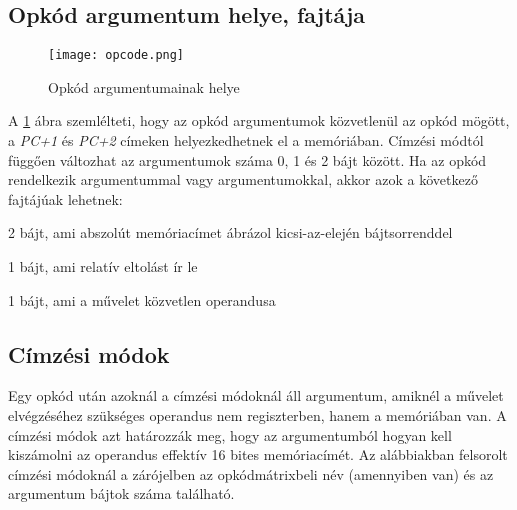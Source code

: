 \subsection{Opkód argumentum helye, fajtája}

\begin{figure}[H]
	\centering
	\texttt{[image: opcode.png]}
	\caption{Opkód argumentumainak helye}
	\label{fig:argplacement}
\end{figure}

A \ref{fig:argplacement} ábra szemlélteti, hogy az opkód argumentumok közvetlenül az opkód mögött, a \emph{PC+1} és \emph{PC+2} címeken helyezkedhetnek el a memóriában. Címzési módtól függően változhat az argumentumok száma 0, 1 és 2 bájt között.
Ha az opkód rendelkezik argumentummal vagy argumentumokkal, akkor azok a következő fajtájúak lehetnek:

\begin{compactitem}
	\item 2 bájt, ami abszolút memóriacímet ábrázol kicsi-az-elején bájtsorrenddel 
	\item 1 bájt, ami relatív eltolást ír le
	\item 1 bájt, ami a művelet közvetlen operandusa
\end{compactitem}

\subsection{Címzési módok}

Egy opkód után azoknál a címzési módoknál áll argumentum, amiknél a művelet elvégzéséhez 
szükséges operandus nem regiszterben, hanem a memóriában van. A címzési módok azt határozzák meg, hogy az argumentumból hogyan kell kiszámolni az operandus effektív 16 bites memóriacímét. Az alábbiakban felsorolt  címzési módoknál a zárójelben az opkódmátrixbeli név (amennyiben van) és az argumentum bájtok száma található.  


